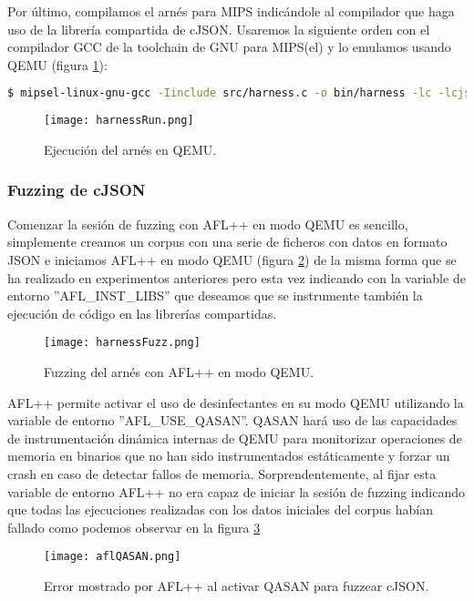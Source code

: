 Por último, compilamos el arnés para MIPS indicándole al compilador que haga uso de la librería compartida de cJSON. Usaremos la 
siguiente orden con el compilador GCC de la toolchain de GNU para MIPS(el) y lo emulamos usando QEMU (figura \ref{fig:harnessRun}):

\begin{lstlisting}[language=bash]
    $ mipsel-linux-gnu-gcc -Iinclude src/harness.c -o bin/harness -lc -lcjson
\end{lstlisting}

\begin{figure}[H]
    \centering
    \texttt{[image: harnessRun.png]}
    \caption{Ejecución del arnés en QEMU.}
    \label{fig:harnessRun}
\end{figure}

\subsubsection{Fuzzing de cJSON}
Comenzar la sesión de fuzzing con AFL++ en modo QEMU es sencillo, simplemente creamos un corpus con una serie de ficheros con datos en formato JSON e iniciamos AFL++ en modo QEMU (figura \ref{fig:harnessFuzz})
de la misma forma que se ha realizado en experimentos anteriores pero esta vez indicando con la variable de entorno
''AFL\_INST\_LIBS'' que deseamos que se instrumente también la ejecución de código en las librerías compartidas.

\begin{figure}[H]
    \centering
    \texttt{[image: harnessFuzz.png]}
    \caption{Fuzzing del arnés con AFL++ en modo QEMU.}
    \label{fig:harnessFuzz}
\end{figure}

AFL++ permite activar el uso de desinfectantes en su modo QEMU utilizando la variable de entorno ''AFL\_USE\_QASAN''.
QASAN hará uso de las capacidades de instrumentación dinámica internas de QEMU para monitorizar operaciones de memoria 
en binarios que no han sido instrumentados estáticamente y forzar un crash en caso de detectar fallos de memoria. 
Sorprendentemente, al fijar esta variable de entorno AFL++ no era capaz de iniciar la sesión de fuzzing indicando que 
todas las ejecuciones realizadas con los datos iniciales del corpus habían fallado como podemos 
observar en la figura \ref{fig:aflQASAN}

\begin{figure}[H]
    \centering
    \texttt{[image: aflQASAN.png]}
    \caption{Error mostrado por AFL++ al activar QASAN para fuzzear cJSON.}
    \label{fig:aflQASAN}
\end{figure}

